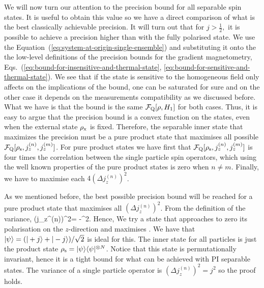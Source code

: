 We will now turn our attention to
the precision bound for all separable spin states.
It is useful to obtain this value so we have a direct comparison of what is
the best classically achievable precision.
It will turn out that for $j>\frac{1}{2},$ it is possible
to achieve a precision higher than with the fully polarised state.
We use the Equation~(\ref{eq:system-at-origin-single-ensemble}) and substituting it onto the the low-level definitions of the precision bounds for the gradient magnetometry, Eqs.~(\ref{eq:bound-for-insensitive-and-thermal-state}, \ref{eq:bound-for-sensitive-and-thermal-state}).
We see that if the state is sensitive to the homogeneous field only affects on the implications of the bound, one can be saturated for sure and on the other case it depends on the measurements compatibility as we discussed before.
What we have is that the bound is the same $\mathcal{F}_{\textnormal{Q}}[{\textstyle \rho, H_1}]$ for both cases.
Thus, it is easy to argue that the precision bound is a convex function on the states, even when the external state $\rho_{\rm x}$ is fixed.
Therefore, the separable inner state that maximizes the precision must be a pure product state that maximises all possible $\mathcal{F}_{\textnormal{Q}}[{\textstyle \rho_{\rm s}, j_z^{(n)}, j_z^{(m)}}]$.%
For pure product states we have first that $\mathcal{F}_{\textnormal{Q}}[{\textstyle \rho_{\rm s}, j_z^{(n)}, j_z^{(m)}}]$ is four times the correlation between the single particle spin operators, which using the well known properties of the pure product states is  zero when $n \neq m$.
Finally, we have to maximise each $4(\Delta j_z^{(n)})^2$.


As we mentioned before, the best possible precision bound will be reached for a pure product state that maximises all $(\Delta j_z^{(n)})^2$.
From the definition of the variance,
\be
(\Delta j_z^{(n)})^2=
-^2.
\ee
Hence, We try a state that approaches to zero its polarisation on the $z$-direction and maximises .
We have that  $\vert \psi \rangle=(\vert +j \rangle+\vert -j \rangle)/\sqrt{2}$ is ideal for this.
The inner state for all particles is just the product state $\rho_{\rm s} =\vert \psi \rangle\langle \psi \vert^{\otimes N}$.
Notice that this state is permutationally invariant, hence it is a tight bound for what can be achieved with PI separable states.
The variance of a single particle operator is $(\Delta j_z^{(n)})^2=j^2$ so the proof holds.

